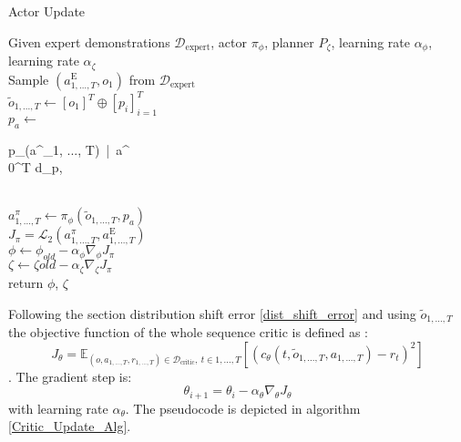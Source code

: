 \begin{algorithm}
    \caption{Actor Update}
    \label{Actor_Update_Alg}
    \begin{algorithmic}
    \Require Given expert demonstrations $\mathcal{D}_{\text{expert}}$, actor $\pi_{\phi}$, planner $P_{\zeta}$, 
    learning rate $\alpha_{\phi}$, learning rate $\alpha_{\zeta}$\\
    \State Sample $(a^{\text{E}}_{1, ..., T}, o_1)$ from $\mathcal{D}_{\text{expert}}$\\
    \State $\tilde{o}_{1, ..., T} \gets [o_1]^T \oplus [p_i]_{i=1}^T$ \hfill{} \\
    \State $p_a \gets $
    \begin{cases}
        p_{\zeta}(a^{}_{1, ..., T})\ |\ a^{} \notin {}\\
        0^{T \times d_p}, 
    \end{cases} \hfill{} \\
    \State $a^\pi_{1,...,T} \gets \pi_{\phi}(\tilde{o}_{1, ..., T}, p_a)$ \hfill{} \\
    \State $J_{\pi} = \mathcal{L}_2(a^\pi_{1,...,T}, a^{\text{E}}_{1, ..., T})$ \hfill{} \\
    \State $\phi \gets \phi_{old} - \alpha_{\phi} \nabla_{\phi}J_{\pi}$\\
    $\zeta \gets \zeta{old} - \alpha_{\zeta} \nabla_{\zeta}J_{\pi}$ \hfill{} \\
    \State return $\phi$, $\zeta$
\end{algorithmic}
\end{algorithm}
Following the section distribution shift error \ref{dist_shift_error} and using $\tilde{o}_{1, ..., T}$ the objective function of the whole sequence critic is defined as :
\begin{equation}
    J_{\theta} = \mathbb{E}_{(o, a_{1,...,T}, r_{1,...,T}) \in \mathcal{D}_{\text{critic}},\ t \in {1, ..., T}}\left[(c_{\theta}(t, \tilde{o}_{1, ..., T}, a_{1,...,T}) - r_t)^2\right]
\end{equation}
. The gradient step is:
\begin{equation*}
    \theta_{i+1} = \theta_i - \alpha_{\theta} \nabla_{\theta}J_{\theta}
\end{equation*}
with learning rate $\alpha_{\theta}$. The pseudocode is depicted in algorithm \ref{Critic_Update_Alg}.
